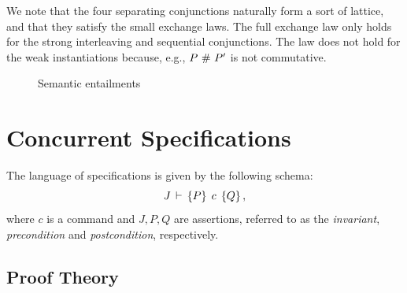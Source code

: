 \documentclass[11pt]{report}
\begin{document}
We note that the four separating conjunctions naturally form a sort of lattice, and that they satisfy the small exchange laws. The full exchange law only holds for the strong interleaving and sequential conjunctions. The law does not hold for the weak instantiations because, e.g., $P \operatorname{\,\#\,} P'$ is not commutative. 

\begin{figure}[ht]
	\centering
	\caption{\label{fig:entailments}Semantic entailments}
\end{figure}


\section{Concurrent Specifications}
\label{sec:specifications}
\label{sec:multiprocessor-specifications}

The language of specifications is given by the following schema: \[ J\,\vdash\,\left\lbrace P \right\rbrace\;c\;\left\lbrace Q \right\rbrace, \] where $c$ is a command and $J,P,Q$ are assertions, referred to as the \emph{invariant}, \emph{precondition} and \emph{postcondition}, respectively. 

\subsection{Proof Theory}
\label{sec:proof-theory}
\end{document}
